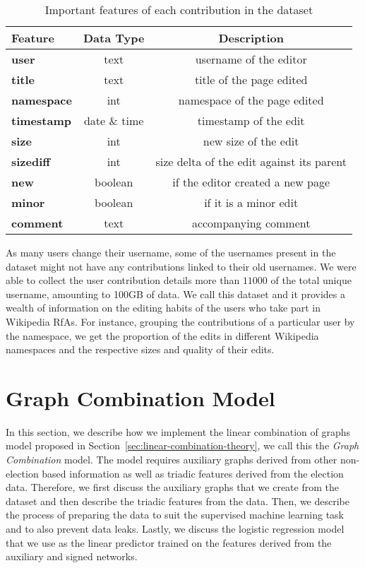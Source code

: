 \begin{table}[htp]
    \centering
    \caption{Important features of each contribution in the \usercontrib dataset}
    \label{tab:usercontrib-features}
    \begin{tabular}{lcc}
        \toprule
        Feature & Data Type & Description\\
        \midrule
        \textbf{user}&text& username of the editor\\
        \textbf{title}&text & title of the page edited\\
        \textbf{namespace}&int& namespace of the page edited\\
        \textbf{timestamp}&date \& time & timestamp of the edit\\
        \textbf{size}&int& new size of the edit \\
        \textbf{sizediff}& int & size delta of the edit against its parent\\
        \textbf{new}&boolean &if the editor created a new page \\
        \textbf{minor}&boolean& if it is a minor edit\\
        \textbf{comment}& text& accompanying comment\\
        \bottomrule
    \end{tabular}
\end{table}
As many users change their username, some of the usernames present in the \wikirfa dataset might not have any contributions linked to their old usernames.
We were able to collect the user contribution details more than $11000$ of the total unique username, amounting to 100GB of data.
We call this dataset \usercontrib and it provides a wealth of information on the editing habits of the users who take part in Wikipedia RfAs. 
For instance, grouping the contributions of a particular user by the namespace, we get the proportion of the edits in different Wikipedia namespaces and the respective sizes and quality of their edits.

\section{Graph Combination Model}
\label{sec:linear-combination-implementation}
In this section, we describe how we implement the linear combination of graphs model proposed in Section~\ref{sec:linear-combination-theory}, we call this the \textit{Graph Combination} model.
The model requires auxiliary graphs derived from other non-election based information as well as triadic features derived from the election data.
Therefore, we first discuss the auxiliary graphs that we create from the \usercontrib dataset and then describe the triadic features from the \wikirfa data.
Then, we describe the process of preparing the data to suit the supervised machine learning task and to also prevent data leaks.
Lastly, we discuss the logistic regression model that we use as the linear predictor trained on the features derived from the auxiliary and signed networks.

